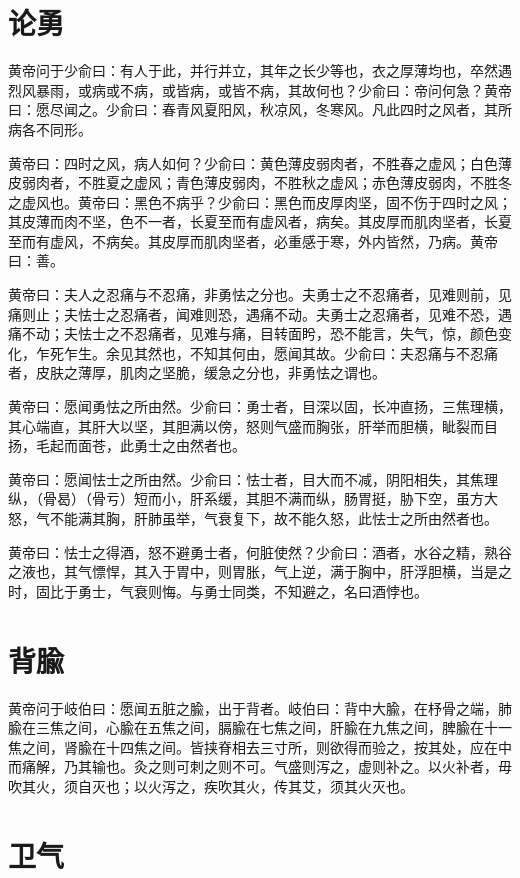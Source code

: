 \documentclass[12pt,UTF8]{ctexbook}
\begin{document}
	
	
	\chapter{论勇}
	
	黄帝问于少俞曰：有人于此，并行并立，其年之长少等也，衣之厚薄均也，卒然遇烈风暴雨，或病或不病，或皆病，或皆不病，其故何也？少俞曰：帝问何急？黄帝曰：愿尽闻之。少俞曰：春青风夏阳风，秋凉风，冬寒风。凡此四时之风者，其所病各不同形。
	
	黄帝曰：四时之风，病人如何？少俞曰：黄色薄皮弱肉者，不胜春之虚风；白色薄皮弱肉者，不胜夏之虚风；青色薄皮弱肉，不胜秋之虚风；赤色薄皮弱肉，不胜冬之虚风也。黄帝曰：黑色不病乎？少俞曰：黑色而皮厚肉坚，固不伤于四时之风；其皮薄而肉不坚，色不一者，长夏至而有虚风者，病矣。其皮厚而肌肉坚者，长夏至而有虚风，不病矣。其皮厚而肌肉坚者，必重感于寒，外内皆然，乃病。黄帝曰：善。
	
	黄帝曰：夫人之忍痛与不忍痛，非勇怯之分也。夫勇士之不忍痛者，见难则前，见痛则止；夫怯士之忍痛者，闻难则恐，遇痛不动。夫勇士之忍痛者，见难不恐，遇痛不动；夫怯士之不忍痛者，见难与痛，目转面盻，恐不能言，失气，惊，颜色变化，乍死乍生。余见其然也，不知其何由，愿闻其故。少俞曰：夫忍痛与不忍痛者，皮肤之薄厚，肌肉之坚脆，缓急之分也，非勇怯之谓也。
	
	黄帝曰：愿闻勇怯之所由然。少俞曰：勇士者，目深以固，长冲直扬，三焦理横，其心端直，其肝大以坚，其胆满以傍，怒则气盛而胸张，肝举而胆横，眦裂而目扬，毛起而面苍，此勇士之由然者也。
	
	黄帝曰：愿闻怯士之所由然。少俞曰：怯士者，目大而不减，阴阳相失，其焦理纵，（骨曷）（骨亏）短而小，肝系缓，其胆不满而纵，肠胃挺，胁下空，虽方大怒，气不能满其胸，肝肺虽举，气衰复下，故不能久怒，此怯士之所由然者也。
	
	黄帝曰：怯士之得酒，怒不避勇士者，何脏使然？少俞曰：酒者，水谷之精，熟谷之液也，其气慓悍，其入于胃中，则胃胀，气上逆，满于胸中，肝浮胆横，当是之时，固比于勇士，气衰则悔。与勇士同类，不知避之，名曰酒悖也。
	\chapter{背腧}
	
	黄帝问于岐伯曰：愿闻五脏之腧，出于背者。岐伯曰：背中大腧，在杼骨之端，肺腧在三焦之间，心腧在五焦之间，膈腧在七焦之间，肝腧在九焦之间，脾腧在十一焦之间，肾腧在十四焦之间。皆挟脊相去三寸所，则欲得而验之，按其处，应在中而痛解，乃其输也。灸之则可刺之则不可。气盛则泻之，虚则补之。以火补者，毋吹其火，须自灭也；以火泻之，疾吹其火，传其艾，须其火灭也。
	\chapter{卫气}
	
\end{document}

